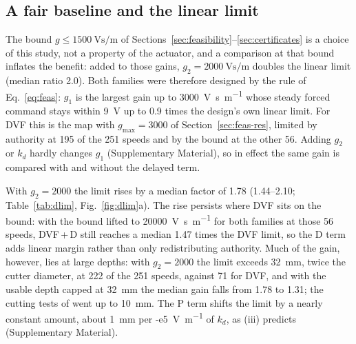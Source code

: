 \subsection{A fair baseline and the linear limit}\label{sec:delayed-limit}

The bound $g\le\SI{1500}{\volt\second\per\metre}$ of Sections~\ref{sec:feasibility}--\ref{sec:certificates} is a choice of this study, not a property of the actuator, and a comparison at that bound inflates the benefit: added to those gains, $g_2=\SI{2000}{\volt\second\per\metre}$ doubles the linear limit (median ratio 2.0). Both families were therefore designed by the rule of Eq.~\eqref{eq:feas}: $g_1$ is the largest gain up to \SI{3000}{\volt\second\per\metre} whose steady forced command stays within \SI{9}{\volt} up to 0.9 times the design's own linear limit. For DVF this is the map with $g_{\max}=3000$ of Section~\ref{sec:feas-res}, limited by authority at 195 of the 251 speeds and by the bound at the other 56. Adding $g_2$ or $k_d$ hardly changes $g_1$ (Supplementary Material), so in effect the same gain is compared with and without the delayed term.

With $g_2=2000$ the limit rises by a median factor of 1.78 (1.44--2.10; Table~\ref{tab:dlim}, Fig.~\ref{fig:dlim}a). The rise persists where DVF sits on the bound: with the bound lifted to \SI{20000}{\volt\second\per\metre} for both families at those 56 speeds, DVF\,+\,D still reaches a median 1.47 times the DVF limit, so the D term adds linear margin rather than only redistributing authority. Much of the gain, however, lies at large depths: with $g_2=2000$ the limit exceeds \SI{32}{\milli\metre}, twice the cutter diameter, at 222 of the 251 speeds, against 71 for DVF, and with the usable depth capped at \SI{32}{\milli\metre} the median gain falls from 1.78 to 1.31; the cutting tests of \citet{ozsoy2026robust} went up to \SI{10}{\milli\metre}. The P term shifts the limit by a nearly constant amount, about \SI{1}{\milli\metre} per \SI{-e5}{\volt\per\metre} of $k_d$, as (iii) predicts (Supplementary Material).

